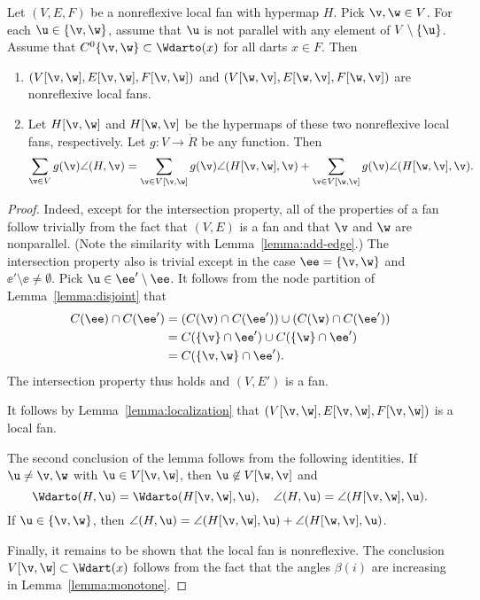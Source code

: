 \begin{lemma}[slicing]\label{lemma:slice} Let
$(V,E,F)$ be a nonreflexive local fan with hypermap $H$.  Pick $\v,\w\in V$. For
each $\u\in \{\v,\w\}$, assume that $\u$ is not parallel with  any
element of $V\setminus\{\u\}$.  Assume that $C^0\{\v,\w\}\subset
\Wdarto(x)$ for all darts $x\in F$.  Then
\begin{enumerate}\wasitemize 
\item $(V[\v,\w],E[\v,\w],F[\v,\w])$ and
$(V[\w,\v],E[\w,\v],F[\w,\v])$ are nonreflexive local fans.
\item Let $H[\v,\w]$ and $H[\w,\v]$ be the hypermaps of these two
  nonreflexive local fans, respectively.  Let $g:V\to\ring{R}$ be any
  function.  Then
\[ 
  \sum_{\v\in V} g(\v)\angle(H,\v) 
  = \sum_{\v\in V[\v,\w]}g(\v)\angle(H[\v,\w],\v) 
  + \sum_{\v\in V[\w,\v]}g(\v)\angle(H[\w,\v],\v).
\] 
\end{enumerate}\wasitemize 
\end{lemma}
%
%

\begin{proof} 
Indeed, except for the intersection property, all of the properties
of a fan follow trivially from the fact that $(V,E)$ is a fan and
that $\v$ and $\w$ are nonparallel.  (Note the similarity with
Lemma~\ref{lemma:add-edge}.)  The intersection property also is
trivial except in the case $\ee=\{\v,\w\}$ and $\ee'\setminus \ee\ne
\emptyset$.  Pick $\u\in \ee'\setminus\ee$.  It follows from the
node partition of Lemma~\ref{lemma:disjoint} that
\begin{align*}
C(\ee) \cap C(\ee') &= (C(\v) \cap C(\ee')) \cup (C(\w)\cap C(\ee')) \\
&= C(\{\v\}\cap \ee') \cup C(\{\w\}\cap \ee') \\
&= C(\{\v,\w\}\cap \ee').
\end{align*}
The intersection property thus holds and $(V,E')$ is a fan.

It follows by Lemma~\ref{lemma:localization} that
$(V[\v,\w],E[\v,\w],F[\v,\w])$ is a local fan.

The second conclusion of the lemma follows from the following identities.
If $\u\ne \v,\w$ with $\u\in V[\v,\w]$, then $\u\not\in V[\w,\v]$ and 
\begin{equation}
\Wdarto(H,\u)=\Wdarto(H[\v,\w],\u),\quad \angle(H,\u) = \angle(H[\v,\w],\u).
\end{equation}
If $\u\in\{\v,\w\}$, then 
$\angle(H,\u)=\angle(H[\v,\w],\u) +\angle(H[\w,\v],\u)$.

Finally, it remains to be shown that the local fan is nonreflexive.
The conclusion $V[\v,\w]\subset \Wdart(x)$ follows from the
fact that the angles $\beta(i)$ are increasing in
Lemma~\ref{lemma:monotone}.
\end{proof}

